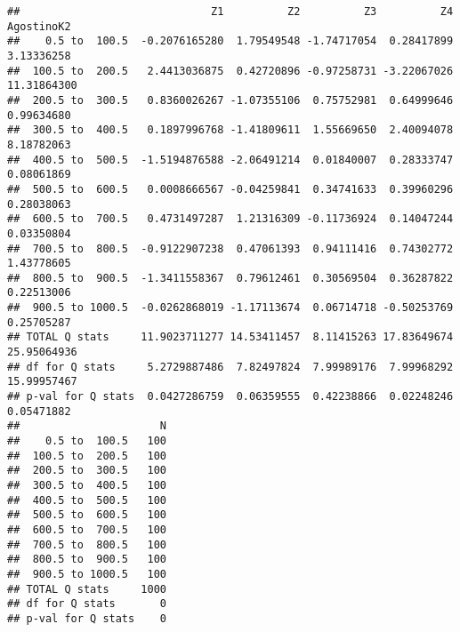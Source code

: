 \documentclass[
]{article}
\begin{document}
\begin{verbatim}
##                              Z1          Z2          Z3          Z4  AgostinoK2
##    0.5 to  100.5  -0.2076165280  1.79549548 -1.74717054  0.28417899  3.13336258
##  100.5 to  200.5   2.4413036875  0.42720896 -0.97258731 -3.22067026 11.31864300
##  200.5 to  300.5   0.8360026267 -1.07355106  0.75752981  0.64999646  0.99634680
##  300.5 to  400.5   0.1897996768 -1.41809611  1.55669650  2.40094078  8.18782063
##  400.5 to  500.5  -1.5194876588 -2.06491214  0.01840007  0.28333747  0.08061869
##  500.5 to  600.5   0.0008666567 -0.04259841  0.34741633  0.39960296  0.28038063
##  600.5 to  700.5   0.4731497287  1.21316309 -0.11736924  0.14047244  0.03350804
##  700.5 to  800.5  -0.9122907238  0.47061393  0.94111416  0.74302772  1.43778605
##  800.5 to  900.5  -1.3411558367  0.79612461  0.30569504  0.36287822  0.22513006
##  900.5 to 1000.5  -0.0262868019 -1.17113674  0.06714718 -0.50253769  0.25705287
## TOTAL Q stats     11.9023711277 14.53411457  8.11415263 17.83649674 25.95064936
## df for Q stats     5.2729887486  7.82497824  7.99989176  7.99968292 15.99957467
## p-val for Q stats  0.0427286759  0.06359555  0.42238866  0.02248246  0.05471882
##                      N
##    0.5 to  100.5   100
##  100.5 to  200.5   100
##  200.5 to  300.5   100
##  300.5 to  400.5   100
##  400.5 to  500.5   100
##  500.5 to  600.5   100
##  600.5 to  700.5   100
##  700.5 to  800.5   100
##  800.5 to  900.5   100
##  900.5 to 1000.5   100
## TOTAL Q stats     1000
## df for Q stats       0
## p-val for Q stats    0
\end{verbatim}
\end{document}
